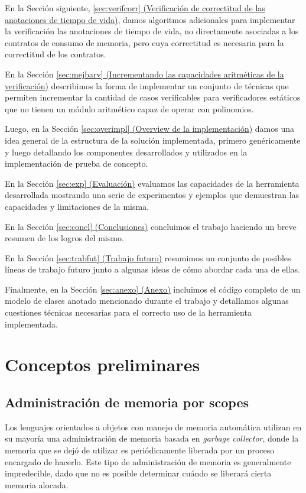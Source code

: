 \documentclass[12pt,a4paper]{article}
\begin{document}
			En la Sección siguiente, \hyperref[sec:verifcorr]{\ref*{sec:verifcorr} (Verificación de correctitud de las anotaciones de tiempo de vida)}, damos algoritmos adicionales para implementar la verificación las anotaciones de tiempo de vida, no directamente asociadas a los contratos de consumo de memoria, pero cuya correctitud es necesaria para la correctitud de los contratos.

			En la Sección \hyperref[sec:mejbarv]{\ref*{sec:mejbarv} (Incrementando las capacidades aritméticas de la verificación)} describimos la forma de implementar un conjunto de técnicas que permiten incrementar la cantidad de casos verificables para verificadores estáticos que no tienen un módulo aritmético capaz de operar con polinomios.

			Luego, en la Sección \hyperref[sec:overimpl]{\ref*{sec:overimpl} (Overview de la implementación)} damos una idea general de la estructura de la solución implementada, primero genéricamente y luego detallando los componentes desarrollados y utilizados en la implementación de prueba de concepto.

			En la Sección \hyperref[sec:exp]{\ref*{sec:exp} (Evaluación)} evaluamos las capacidades de la herramienta desarrollada mostrando una serie de experimentos y ejemplos que demuestran las capacidades y limitaciones de la misma.

			En la Sección \hyperref[sec:concl]{\ref*{sec:concl} (Conclusiones)} concluimos el trabajo haciendo un breve resumen de los logros del mismo.

			En la Sección \hyperref[sec:concl]{\ref*{sec:trabfut} (Trabajo futuro)} resumimos un conjunto de posibles líneas de trabajo futuro junto a algunas ideas de cómo abordar cada una de ellas.

			Finalmente, en la Sección \hyperref[sec:anexo]{\ref*{sec:anexo} (Anexo)} incluimos el código completo de un modelo de clases anotado mencionado durante el trabajo y detallamos algunas cuestiones técnicas necesarias para el correcto uso de la herramienta implementada.
	\section{Conceptos preliminares} \label{sec:concprem}
		\subsection{Administración de memoria por scopes}
			Los lenguajes orientados a objetos con manejo de memoria automática utilizan en su mayoría una administración de memoria basada en \textit{garbage collector}, donde la memoria que se dejó de utilizar es periódicamente liberada por un proceso encargado de hacerlo. Este tipo de administración de memoria es generalmente impredecible, dado que no es posible determinar cuándo se liberará cierta memoria alocada.
\end{document}
